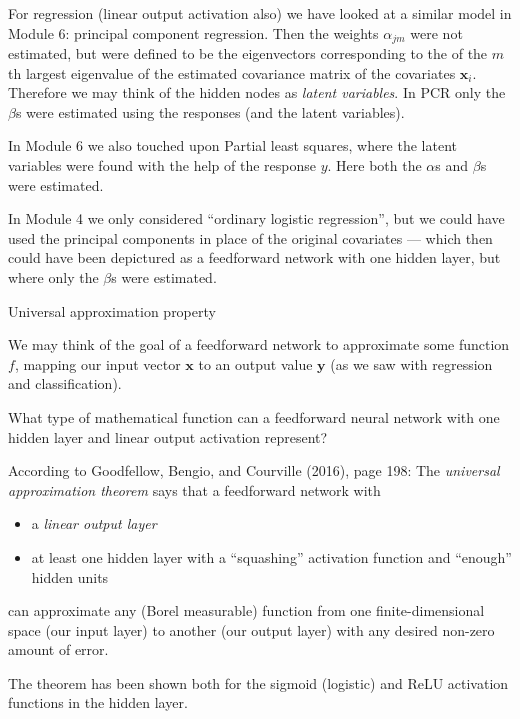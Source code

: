 \documentclass[10pt,ignorenonframetext,]{beamer}
\providecommand{\tightlist}{%
  \setlength{\itemsep}{0pt}\setlength{\parskip}{0pt}}
\begin{document}
\begin{frame}

For regression (linear output activation also) we have looked at a
similar model in Module 6: principal component regression. Then the
weights \(\alpha_{jm}\) were not estimated, but were defined to be the
eigenvectors corresponding to the of the \(m\)th largest eigenvalue of
the estimated covariance matrix of the covariates \({\boldsymbol x}_i\).
Therefore we may think of the hidden nodes as \emph{latent variables}.
In PCR only the \(\beta\)s were estimated using the responses (and the
latent variables).

In Module 6 we also touched upon Partial least squares, where the latent
variables were found with the help of the response \(y\). Here both the
\(\alpha\)s and \(\beta\)s were estimated.

In Module 4 we only considered ``ordinary logistic regression'', but we
could have used the principal components in place of the original
covariates --- which then could have been depictured as a feedforward
network with one hidden layer, but where only the \(\beta\)s were
estimated.

\end{frame}

\begin{frame}

\begin{block}{Universal approximation property}

We may think of the goal of a feedforward network to approximate some
function \(f\), mapping our input vector \({\boldsymbol x}\) to an
output value \({\boldsymbol y}\) (as we saw with regression and
classification).

What type of mathematical function can a feedforward neural network with
one hidden layer and linear output activation represent?

\end{block}

\end{frame}

\begin{frame}

According to Goodfellow, Bengio, and Courville (2016), page 198: The
\emph{universal approximation theorem} says that a feedforward network
with

\begin{itemize}
\tightlist
\item
  a \emph{linear output layer}
\item
  at least one hidden layer with a ``squashing'' activation function and
  ``enough'' hidden units
\end{itemize}

can approximate any (Borel measurable) function from one
finite-dimensional space (our input layer) to another (our output layer)
with any desired non-zero amount of error.

The theorem has been shown both for the sigmoid (logistic) and ReLU
activation functions in the hidden layer.

\end{frame}
\end{document}
